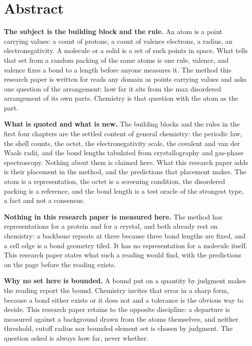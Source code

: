 \chapter*{Abstract}

\textbf{The subject is the building block and the rule.} An atom is a point carrying values: a
count of protons, a count of valence electrons, a radius, an electronegativity. A molecule or a
solid is a set of such points in space. What tells that set from a random packing of the same atoms
is one rule, valence, and valence fixes a bond to a length before anyone measures it. The method
this research paper is written for reads any domain as points carrying values and asks one question of the
arrangement: how far it sits from the max disordered arrangement of its own parts. Chemistry is
that question with the atom as the part.

\textbf{What is quoted and what is new.} The building blocks and the rules in the first four
chapters are the settled content of general chemistry: the periodic law, the shell counts, the
octet, the electronegativity scale, the covalent and van der Waals radii, and the bond lengths
tabulated from crystallography and gas-phase spectroscopy. Nothing about them is claimed here. What
this research paper adds is their placement in the method, and the predictions that placement
makes. The atom is a representation, the octet is a screening condition, the disordered packing is a
reference, and the bond length is a test oracle of the strongest type, a fact and not a consensus.

\textbf{Nothing in this research paper is measured here.} The method has representations for a
protein and for a crystal, and both already rest on chemistry: a backbone repeats at three because
three bond lengths are fixed, and a cell edge is a bond geometry tiled. It has no representation
for a molecule itself. This research paper states what such a reading would find, with the
predictions on the page before the reading exists.

\textbf{Why no set here is bounded.} A bound put on a quantity by judgment makes the reading report
the bound. Chemistry invites that error in a sharp form, because a bond either exists or it does
not and a tolerance is the obvious way to decide. This research paper retains to the opposite
discipline: a departure is measured against a background drawn from the atoms themselves, and neither
threshold, cutoff radius nor bounded element set is chosen by judgment. The question asked is
always how far, never whether.
